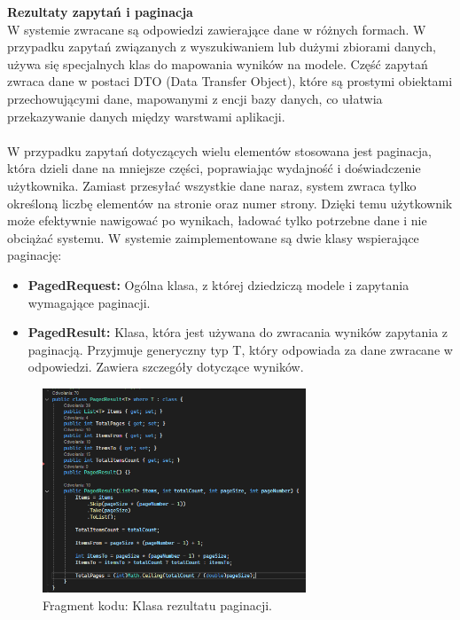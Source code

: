 \documentclass[twoside]{projektInzynierskiMS1}
\begin{document}
\newpage

\noindent \textbf{Rezultaty zapytań i paginacja}\\

W systemie zwracane są odpowiedzi zawierające dane w różnych formach. W przypadku zapytań związanych z wyszukiwaniem lub dużymi zbiorami danych, używa się specjalnych klas do mapowania wyników na modele. Część zapytań zwraca dane w postaci DTO (Data Transfer Object), które są prostymi obiektami przechowującymi dane, mapowanymi z encji bazy danych, co ułatwia przekazywanie danych między warstwami aplikacji.
\\\\
W przypadku zapytań dotyczących wielu elementów stosowana jest paginacja, która dzieli dane na mniejsze części, poprawiając wydajność i doświadczenie użytkownika. Zamiast przesyłać wszystkie dane naraz, system zwraca tylko określoną liczbę elementów na stronie oraz numer strony. Dzięki temu użytkownik może efektywnie nawigować po wynikach, ładować tylko potrzebne dane i nie obciążać systemu. W systemie zaimplementowane są dwie klasy wspierające paginację:

\begin{itemize}
    \item \textbf{PagedRequest:} Ogólna klasa, z której dziedziczą modele i zapytania wymagające paginacji.
    \item \textbf{PagedResult:} Klasa, która jest używana do zwracania wyników zapytania z paginacją. Przyjmuje generyczny typ T, który odpowiada za dane zwracane w odpowiedzi. Zawiera szczegóły dotyczące wyników.
\end{itemize}

\begin{figure}[h!]
    \centering
    \includegraphics[width=0.7\textwidth]{images/ex_pagination.png}
    \caption{Fragment kodu: Klasa rezultatu paginacji.}
\end{figure}
\end{document}
